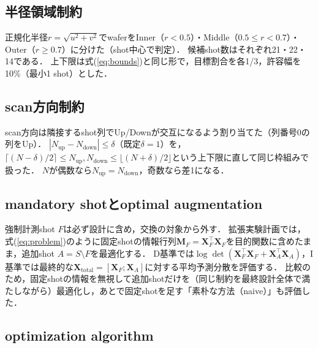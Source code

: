 \documentclass[10.5pt,a4paper]{ltjsarticle}
\begin{document}
\subsection{半径領域制約}

正規化半径$r=\sqrt{u^2+v^2}$でwaferをInner（$r<0.5$）・Middle（$0.5\le r<0.7$）・Outer（$r\ge0.7$）に分けた（shot中心で判定）．
候補shot数はそれぞれ21・22・14である．
上下限は式(\ref{eq:bounds})と同じ形で，目標割合を各1/3，許容幅を10\%（最小1 shot）とした．

\subsection{scan方向制約}

scan方向は隣接するshot列でUp/Downが交互になるよう割り当てた（列番号0の列をUp）．
$|N_\text{up}-N_\text{down}|\le\delta$（既定$\delta=1$）を，$\lceil(N-\delta)/2\rceil\le N_\text{up},N_\text{down}\le\lfloor(N+\delta)/2\rfloor$という上下限に直して同じ枠組みで扱った．
$N$が偶数なら$N_\text{up}=N_\text{down}$，奇数なら差1になる．

\subsection{mandatory shotとoptimal augmentation}

強制計測shot $F$は必ず設計に含め，交換の対象から外す．
拡張実験計画では，式(\ref{eq:problem})のように固定shotの情報行列$\bm{M}_F=\bm{X}_F^\top\bm{X}_F$を目的関数に含めたまま，追加shot $A=S\setminus F$を最適化する\cite{dykstra1971}．
D基準では$\log\det(\bm{X}_F^\top\bm{X}_F+\bm{X}_A^\top\bm{X}_A)$，I基準では最終的な$\bm{X}_\text{total}=[\bm{X}_F;\bm{X}_A]$に対する平均予測分散を評価する．
比較のため，固定shotの情報を無視して追加shotだけを（同じ制約を最終設計全体で満たしながら）最適化し，あとで固定shotを足す「素朴な方法（naive）」も評価した．

\subsection{optimization algorithm}
\label{sec:algorithm}
\end{document}
